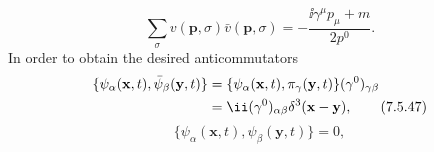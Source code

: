\begin{equation}
\sum_\sigma v(\mathbf p,\sigma)\bar v(\mathbf p,\sigma)
=-\frac{\ii\gamma^\mu p_\mu+m}{2p^0}.
\tag{7.5.46}\label{eq:7.5.46}
\end{equation}
In order to obtain the desired anticommutators
\begin{align}
\{\psi_\alpha(\mathbf x,t),\bar\psi_\beta(\mathbf y,t)\}
&=\{\psi_\alpha(\mathbf x,t),\pi_\gamma(\mathbf y,t)\}
(\gamma^0)_{\gamma\beta}\notag\\
&=\ii(\gamma^0)_{\alpha\beta}\delta^3(\mathbf x-\mathbf y),
\tag{7.5.47}\label{eq:7.5.47}
\end{align}
\begin{equation}
\{\psi_\alpha(\mathbf x,t),\psi_\beta(\mathbf y,t)\}=0,
\tag{7.5.48}\label{eq:7.5.48}
\end{equation}
